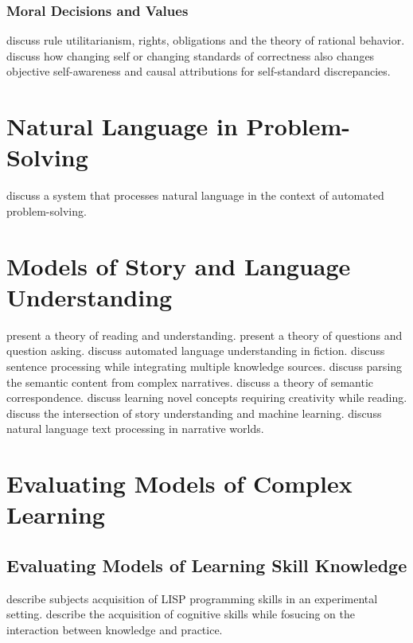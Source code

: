 \subsubsection{Moral Decisions and Values}

\cite{harsanyi:1980} discuss rule utilitarianism, rights, obligations and the theory of rational behavior.
\cite{duval:1999} discuss how changing self or changing standards of correctness also changes objective self-awareness and causal attributions for self-standard discrepancies.


\section{Natural Language in Problem-Solving}

\cite{bobrow:1968} discuss a system that processes natural language in
the context of automated problem-solving.



\section{Models of Story and Language Understanding}


\cite{ram:1999a} present a theory of reading and understanding.
\cite{ram:1999b} present a theory of questions and question asking.
\cite{rapaport:1999} discuss automated language understanding in fiction.
\cite{mahesh:1999} discuss sentence processing while integrating multiple knowledge sources.
\cite{domeshek:1999} discuss parsing the semantic content from complex narratives.
\cite{peterson:1999} discuss a theory of semantic correspondence.
\cite{moorman:1999} discuss learning novel concepts requiring creativity while reading.
\cite{cox:1999b} discuss the intersection of story understanding and machine learning.
\cite{gerrig:1999} discuss natural language text processing in narrative worlds.

\section{Evaluating Models of Complex Learning}


\subsection{Evaluating Models of Learning Skill Knowledge}
\cite{anderson:1993} describe subjects acquisition of LISP programming skills in an experimental setting.
\cite{ohlsson:1993} describe the acquisition of cognitive skills while fosucing on the interaction between knowledge and practice.

